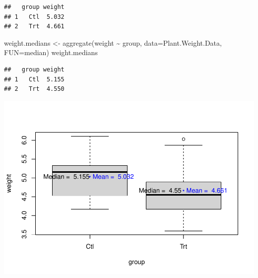 \documentclass[
]{book}
\newenvironment{Shaded}{\begin{snugshade}}{\end{snugshade}}
\newcommand{\AttributeTok}[1]{\textcolor[rgb]{0.77,0.63,0.00}{#1}}
\newcommand{\DecValTok}[1]{\textcolor[rgb]{0.00,0.00,0.81}{#1}}
\newcommand{\FloatTok}[1]{\textcolor[rgb]{0.00,0.00,0.81}{#1}}
\newcommand{\FunctionTok}[1]{\textcolor[rgb]{0.00,0.00,0.00}{#1}}
\newcommand{\NormalTok}[1]{#1}
\newcommand{\OtherTok}[1]{\textcolor[rgb]{0.56,0.35,0.01}{#1}}
\newcommand{\SpecialCharTok}[1]{\textcolor[rgb]{0.00,0.00,0.00}{#1}}
\newcommand{\StringTok}[1]{\textcolor[rgb]{0.31,0.60,0.02}{#1}}
\begin{document}
\begin{verbatim}
##   group weight
## 1   Ctl  5.032
## 2   Trt  4.661
\end{verbatim}

\begin{Shaded}
\begin{Highlighting}[]
\NormalTok{weight.medians }\OtherTok{\textless{}{-}} \FunctionTok{aggregate}\NormalTok{(weight }\SpecialCharTok{\textasciitilde{}}\NormalTok{  group, }\AttributeTok{data=}\NormalTok{Plant.Weight.Data, }\AttributeTok{FUN=}\NormalTok{median)}
\NormalTok{weight.medians}
\end{Highlighting}
\end{Shaded}

\begin{verbatim}
##   group weight
## 1   Ctl  5.155
## 2   Trt  4.550
\end{verbatim}

\begin{Shaded}
\end{Shaded}

\includegraphics{SurveyBook_files/figure-latex/rawDataShow2-1.pdf}
\end{document}
